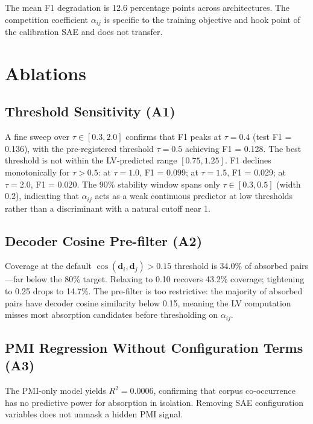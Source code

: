 \documentclass{article}
\begin{document}
The mean F1 degradation is 12.6 percentage points across architectures. The competition coefficient $\alpha_{ij}$ is specific to the training objective and hook point of the calibration SAE and does not transfer.


\section{Ablations}
\label{sec:ablations}

\subsection{Threshold Sensitivity (A1)}
\label{sec:ablation_threshold}

A fine sweep over $\tau \in [0.3, 2.0]$ confirms that F1 peaks at $\tau = 0.4$ (test F1 = 0.136), with the pre-registered threshold $\tau = 0.5$ achieving F1 = 0.128. The best threshold is not within the LV-predicted range $[0.75, 1.25]$. F1 declines monotonically for $\tau > 0.5$: at $\tau = 1.0$, F1 = 0.099; at $\tau = 1.5$, F1 = 0.029; at $\tau = 2.0$, F1 = 0.020. The 90\% stability window spans only $\tau \in [0.3, 0.5]$ (width 0.2), indicating that $\alpha_{ij}$ acts as a weak continuous predictor at low thresholds rather than a discriminant with a natural cutoff near 1.

\subsection{Decoder Cosine Pre-filter (A2)}
\label{sec:ablation_filter}

Coverage at the default $\cos(\mathbf{d}_i, \mathbf{d}_j) > 0.15$ threshold is 34.0\% of absorbed pairs---far below the 80\% target. Relaxing to 0.10 recovers 43.2\% coverage; tightening to 0.25 drops to 14.7\%. The pre-filter is too restrictive: the majority of absorbed pairs have decoder cosine similarity below 0.15, meaning the LV computation misses most absorption candidates before thresholding on $\alpha_{ij}$.

\subsection{PMI Regression Without Configuration Terms (A3)}
\label{sec:ablation_pmi}

The PMI-only model yields $R^2 = 0.0006$, confirming that corpus co-occurrence has no predictive power for absorption in isolation. Removing SAE configuration variables does not unmask a hidden PMI signal.
\end{document}
